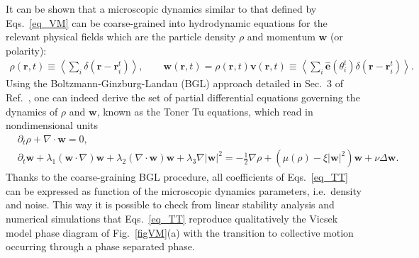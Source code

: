 It can be shown that a microscopic dynamics similar to that defined by Eqs.~\eqref{eq_VM} can be coarse-grained into hydrodynamic equations for the relevant physical fields which are the particle density $\rho$ and momentum $\bm w$ (or polarity):
\begin{align*}
\rho(\bm r,t) \equiv \left\langle \sum_i \delta(\bm r - \bm r_i^t) \right\rangle , \qquad 
\bm w(\bm r,t) = \rho(\bm r,t) \bm v(\bm r,t) \equiv \left\langle \sum_i \hat{\bm e}(\theta_i^t)\delta(\bm r - \bm r_i^t) \right\rangle .
\end{align*}
Using the Boltzmann-Ginzburg-Landau (BGL) approach detailed in Sec.~3 of Ref.~\cite{DADAM_LesHouches}, 
one can indeed derive the set of partial differential equations governing the dynamics of $\rho$ and $\bm w$, known as the Toner Tu equations, which read in nondimensional units
\begin{subequations}
\label{eq_TT}
\begin{align}
\label{eq_TT_rho}
& \partial_t \rho + \nabla \cdot \bm w = 0 , \\
\label{eq_TT_w}
& \partial_t \bm w + \lambda_1 (\bm w \cdot \nabla)\bm w + \lambda_2 (\nabla \cdot \bm w) \bm w + \lambda_3 \nabla |\bm w|^2 = 
-\frac{1}{2}\nabla \rho + \left( \mu(\rho) - \xi |\bm w|^2 \right) \bm w + \nu \Delta \bm w .
\end{align}
\end{subequations}
Thanks to the coarse-graining BGL procedure, all coefficients of Eqs.~\eqref{eq_TT} can be expressed as function of the microscopic dynamics parameters, i.e.\ density and noise.
This way it is possible to check from linear stability analysis and numerical simulations that Eqs.~\eqref{eq_TT} reproduce qualitatively the 
Vicsek model phase diagram of Fig.~\ref{figVM}(a) with the transition to collective motion occurring through a phase separated phase.
 
